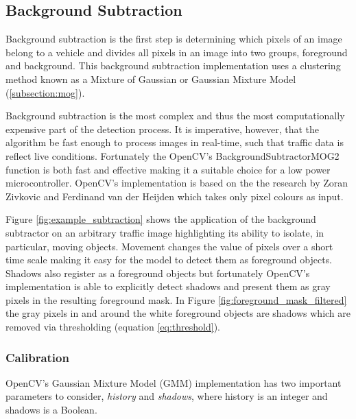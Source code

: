 \subsection{Background Subtraction}
\label{subsection:training}
Background subtraction is the first step is determining which pixels of an image belong to a vehicle and divides all pixels in an image into two groups, foreground and background. This background subtraction implementation uses a clustering method known as a Mixture of Gaussian or Gaussian Mixture Model (\ref{subsection:mog}). 

Background subtraction is the most complex and thus the most computationally expensive part of the detection process. It is imperative, however, that the algorithm be fast enough to process images in real-time, such that traffic data is reflect live conditions. Fortunately the OpenCV's BackgroundSubtractorMOG2 function \cite{opencv_mog2} is both fast and effective making it a suitable choice for a low power microcontroller. OpenCV's implementation is based on the the research by Zoran Zivkovic and Ferdinand van der Heijden \cite{zivkovic_pattern_recognition} \cite{zivkovic_heijden_pattern_recognition_letters} which takes only pixel colours as input.

Figure \ref{fig:example_subtraction} shows the application of the background subtractor on an arbitrary traffic image highlighting its ability to isolate, in particular, moving objects. Movement changes the value of pixels over a short time scale making it easy for the model to detect them as foreground objects. Shadows also register as a foreground objects but fortunately OpenCV's implementation is able to explicitly detect shadows and present them as gray pixels in the resulting foreground mask. In Figure \ref{fig:foreground_mask_filtered} the gray pixels in and around the white foreground objects are shadows which are removed via thresholding (equation \ref{eq:threshold}). 

\subsubsection{Calibration}

OpenCV's Gaussian Mixture Model (GMM) implementation has two important parameters to consider, \emph{history} and \emph{shadows}, where history is an integer and shadows is a Boolean. 

